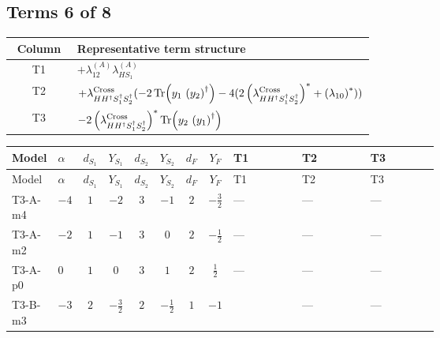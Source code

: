 \documentclass[8pt]{article}
\begin{document}
\begin{landscape}
\subsection*{Terms 6 of 8}
\begin{center}
\begin{tabular}{@{}c >{\raggedright\arraybackslash}p{0.82\linewidth}@{}}
\toprule
Column & Representative term structure \\
\midrule
T1 & \(\displaystyle +{\lambda_{12}^{(A)}} {\lambda_{HS_1}^{(A)}}\) \\
\midrule
T2 & \(\displaystyle +{\lambda_{H H^\dagger S_1^\dagger S_2^\dagger}^{\rm Cross}} (-2 \operatorname{Tr}\!\left({y_1}\,\left({y_2}\right)^{\dagger}\right)-4 (2 \left({\lambda_{H H^\dagger S_1^\dagger S_2^\dagger}^{\rm Cross}}\right)^{*}+\left({\lambda_{10}}\right)^{*}))\) \\
\midrule
T3 & \(\displaystyle -2 \left({\lambda_{H H^\dagger S_1^\dagger S_2^\dagger}^{\rm Cross}}\right)^{*} \operatorname{Tr}\!\left({y_2}\,\left({y_1}\right)^{\dagger}\right)\) \\
\midrule
\bottomrule
\end{tabular}
\end{center}
\smallskip
\tiny
\begin{longtable}{@{}llcccccc >{\raggedright\arraybackslash}p{0.21\linewidth} >{\raggedright\arraybackslash}p{0.21\linewidth} >{\raggedright\arraybackslash}p{0.21\linewidth}@{}}
\toprule
Model & $\alpha$ & $d_{S_1}$ & $Y_{S_1}$ & $d_{S_2}$ & $Y_{S_2}$ & $d_F$ & $Y_F$ & T1 & T2 & T3 \\
\midrule
\endfirsthead
\toprule
Model & $\alpha$ & $d_{S_1}$ & $Y_{S_1}$ & $d_{S_2}$ & $Y_{S_2}$ & $d_F$ & $Y_F$ & T1 & T2 & T3 \\
\midrule
\endhead
T3-A-m4 & $-4$ & $1$ & $-2$ & $3$ & $-1$ & $2$ & $-\frac{3}{2}$ & --- & --- & --- \\
\midrule
T3-A-m2 & $-2$ & $1$ & $-1$ & $3$ & $0$ & $2$ & $-\frac{1}{2}$ & --- & --- & --- \\
\midrule
T3-A-p0 & $0$ & $1$ & $0$ & $3$ & $1$ & $2$ & $\frac{1}{2}$ & --- & --- & --- \\
\midrule
T3-B-m3 & $-3$ & $2$ & $-\frac{3}{2}$ & $2$ & $-\frac{1}{2}$ & $1$ & $-1$ & \scriptsize\adjustbox{max width=\linewidth}{$\begin{gathered} +{\lambda_{12}^{(A)}} {\lambda_{HS_1}^{(A)}}\end{gathered}$} & --- & --- \\
\midrule

\end{longtable}
\end{landscape}
\end{document}
